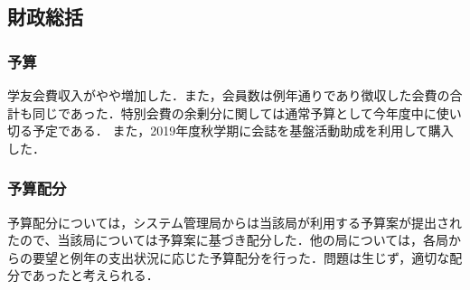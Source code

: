 \subsection*{財政総括}

\subsubsection*{予算}
学友会費収入がやや増加した．また，会員数は例年通りであり徴収した会費の合計も同じであった．特別会費の余剰分に関しては通常予算として今年度中に使い切る予定である．
また，2019年度秋学期に会誌を基盤活動助成を利用して購入した．

\subsubsection*{予算配分}
予算配分については，システム管理局からは当該局が利用する予算案が提出されたので、当該局については予算案に基づき配分した．他の局については，各局からの要望と例年の支出状況に応じた予算配分を行った．問題は生じず，適切な配分であったと考えられる．